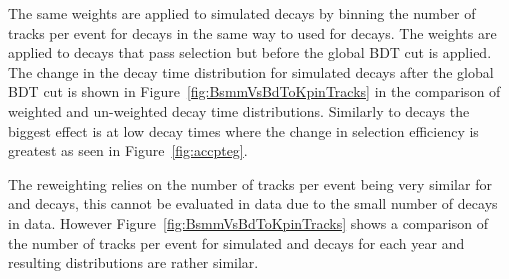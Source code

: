 The same weights are applied to simulated \bsmumu decays by binning the number of tracks per event for \bsmumu decays in the same way to used for \bdkpi decays. The weights are applied to decays that pass selection but before the global BDT cut is applied. The change in the decay time distribution for \bsmuu simulated decays after the global BDT cut is shown in Figure~\ref{fig:BsmmVsBdToKpinTracks} in the comparison of weighted and un-weighted \bsmumu decay time distributions. Similarly to \bdkpi decays the biggest effect is at low decay times where the change in selection efficiency is greatest as seen in Figure~\ref{fig:accpteg}.

The reweighting relies on the number of tracks per event being very similar for \bdkpi and \bsmumu decays, this cannot be evaluated in data due to the small number of \bsmumu decays in data. However Figure~\ref{fig:BsmmVsBdToKpinTracks} shows a comparison of the number of tracks per event for simulated \bsmumu and \bdkpi decays for each year and resulting distributions are rather similar.



